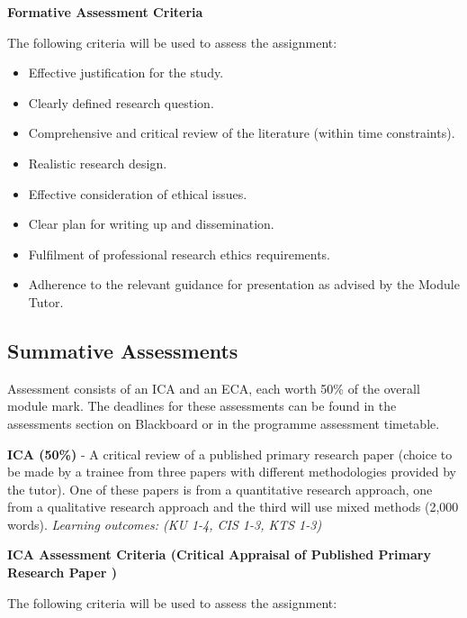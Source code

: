 \documentclass[
]{book}
\providecommand{\tightlist}{%
  \setlength{\itemsep}{0pt}\setlength{\parskip}{0pt}}
\begin{document}
\textbf{Formative Assessment Criteria}

The following criteria will be used to assess the assignment:

\begin{itemize}
\tightlist
\item
  Effective justification for the study.
\item
  Clearly defined research question.
\item
  Comprehensive and critical review of the literature (within time constraints).
\item
  Realistic research design.
\item
  Effective consideration of ethical issues.
\item
  Clear plan for writing up and dissemination.
\item
  Fulfilment of professional research ethics requirements.
\item
  Adherence to the relevant guidance for presentation as advised by the Module Tutor.
\end{itemize}

\hypertarget{summative-assessments}{%
\subsection{Summative Assessments}\label{summative-assessments}}

Assessment consists of an ICA and an ECA, each worth 50\% of the overall module mark. The deadlines for these assessments can be found in the assessments section on Blackboard or in the programme assessment timetable.

\textbf{ICA (50\%)} - A critical review of a published primary research paper (choice to be made by a trainee from three papers with different methodologies provided by the tutor). One of these papers is from a quantitative research approach, one from a qualitative research approach and the third will use mixed methods (2,000 words).
\emph{Learning outcomes: (KU 1-4, CIS 1-3, KTS 1-3)}

\textbf{ICA Assessment Criteria (Critical Appraisal of Published Primary Research Paper )}

The following criteria will be used to assess the assignment:
\end{document}
